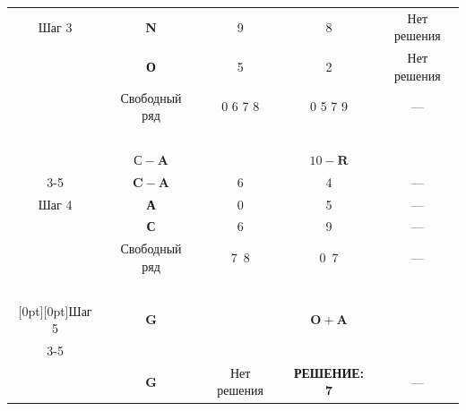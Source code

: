 \begin{table}
\begin{center}
\begin{tabular}{|c|c|c|c|c|}


  Шаг 3&\textbf{N}&9&8&Нет решения\\




 &\textbf{О}&5&2&Нет решения\\




 &{Свободный ряд}&0 6 7 8&0 5 7 9 &---\\


 \hline


 &&\multicolumn{3}{c|}{\ }\\[-10pt]


&$\mathbf{С} - \mathbf{A}$&\multicolumn{3}{c|}{$10 - \mathbf{R}$}\\


  \cline{3-5}


 &$\mathbf{C}-\mathbf{A}$&6&4&---\\




  Шаг 4&\textbf{А}&0&5&---\\




  &\textbf{С}&6&9&---\\




 &{Свободный ряд}&7~8&0~7&---\\


 \hline


 &&\multicolumn{3}{c|}{\ }\\[-10pt]


\multicolumn{1}{|c|}{\raisebox{-6pt}[0pt][0pt]{Шаг 5}}&\textbf{G}&\multicolumn{3}{c|}{$\mathbf{O} + \mathbf{A}$ }\\


 \cline{3-5}


  &&&&\\[-9pt]


 &\textbf{G}&Нет решения&\textbf{РЕШЕНИЕ: 7}&---\\


 \hline


 \end{tabular}


 \end{center}


 \vspace*{-6pt}


 \end{table}


